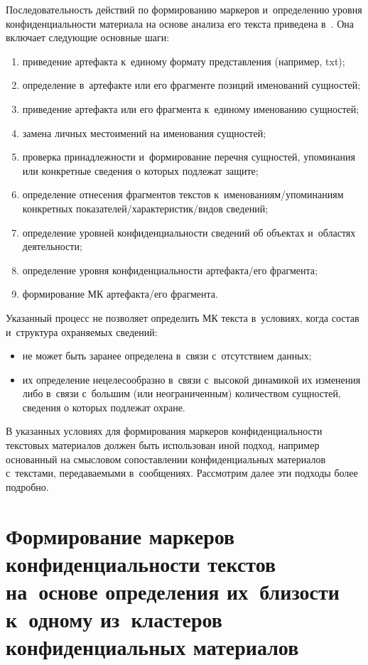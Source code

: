\begin{multicols}{2}
  Последовательность действий по формированию маркеров и~определению 
уровня конфиденциальности материала на основе анализа его текста 
приведена в~\cite{1-bs}. Она включает следующие основные шаги: 
  \begin{enumerate}[(1)]
  \item приведение артефакта к~единому формату представления (например, 
txt);
\item определение в~артефакте или его фрагменте позиций именований 
сущностей;
\item приведение артефакта или его фрагмента к~единому именованию 
сущностей;
\item замена личных местоимений на именования сущностей;
\item проверка принадлежности и~формирование перечня сущностей, 
упоминания или конкретные сведения о которых подлежат защите; 
\item определение отнесения фрагментов текстов  
к~име\-но\-ва\-ни\-ям/упо\-ми\-на\-ни\-ям конкретных 
показателей/характеристик/видов сведений; 
\item определение уровней конфиденциальности сведений об объектах 
и~областях де\-я\-тель\-ности;
\item определение уровня конфиденциальности артефакта/его фрагмента;
\item формирование МК ар\-те\-фак\-та/его фрагмента.
\end{enumerate}

  Указанный процесс не позволяет определить МК
текста в~условиях, когда состав и~структура охраняемых сведений:
  \begin{itemize}
  \item не может быть заранее определена в~связи с~отсутствием данных;
\item их определение нецелесообразно в~связи с~высокой динамикой их 
изменения либо в~связи с~большим (или неограниченным) количеством 
сущностей, сведения о которых подлежат \mbox{охране}.
  \end{itemize}
  
  В указанных условиях для формирования маркеров конфиденциальности 
текстовых материалов должен быть использован иной подход, например 
основанный на смысловом сопоставлении конфиденциальных материалов 
с~текстами, передаваемыми в~сообщениях. Рассмотрим далее эти подходы более 
подробно.

\section{Формирование маркеров конфиденциальности текстов 
на~основе определения их~близости к~одному из~кластеров 
конфиденциальных материалов} %
  

\end{multicols}
